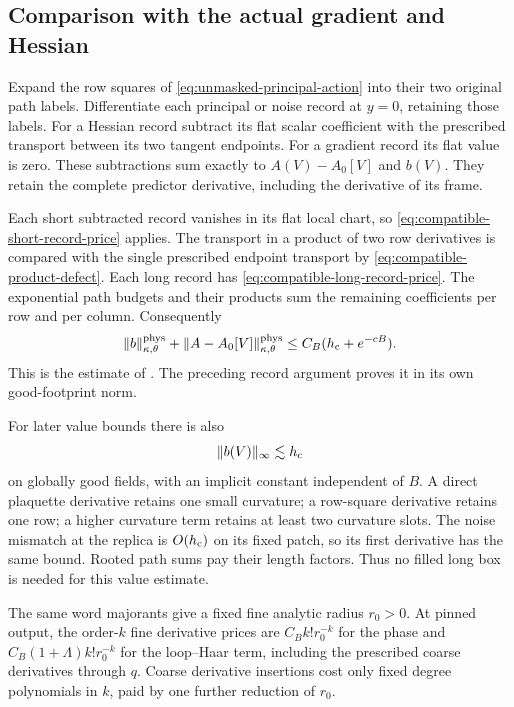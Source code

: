 \documentclass[11pt,reqno]{amsart}
\numberwithin{equation}{section}
\theoremstyle{definition}
\theoremstyle{remark}
\begin{document}
\subsection{Comparison with the actual gradient and Hessian}

Expand the row squares of
\eqref{eq:unmasked-principal-action} into
their two original path labels.
Differentiate each principal or noise
record at \(y=0\), retaining those labels.
For a Hessian record subtract its flat
scalar coefficient with the prescribed
transport between its two tangent endpoints.
For a gradient record its flat value is zero.
These subtractions sum exactly to
\(A(V)-A_0[V]\) and \(b(V)\).
They retain the complete predictor derivative,
including the derivative of its frame.

Each short subtracted record vanishes in
its flat local chart, so
\eqref{eq:compatible-short-record-price}
applies. The transport in a product of
two row derivatives is compared with
the single prescribed endpoint transport
by \eqref{eq:compatible-product-defect}.
Each long record has
\eqref{eq:compatible-long-record-price}.
The exponential path budgets and their
products sum the remaining coefficients
per row and per column. Consequently
\begin{equation}
       \|b\|_{\kappa,\theta}^{\rm phys}
       +\|A-A_0[V]\|_{\kappa,\theta}^{\rm phys}
                         \le C_B(h_{\rm c}+e^{-cB}).
 \label{eq:compatible-actual-comparison}
\end{equation}
This is the estimate of
\cite[Lemma~25.2, pp.~128--132]{Main}.
The preceding record argument proves it
in its own good-footprint norm.

For later value bounds there is also
\begin{equation}
                         \|b(V)\|_\infty\lesssim h_{\rm c}
 \label{eq:compatible-gradient-value}
\end{equation}
on globally good fields, with an implicit constant
independent of \(B\).
A direct plaquette derivative retains
one small curvature; a row-square derivative
retains one row; a higher curvature term
retains at least two curvature slots.
The noise mismatch at the replica is
\(O(h_{\rm c})\) on its fixed patch, so
its first derivative has the same bound.
Rooted path sums pay their length factors.
Thus no filled long box is needed for
this value estimate.

The same word majorants give a fixed fine
analytic radius \(r_0>0\).
At pinned output, the order-\(k\) fine
derivative prices are
\(C_B k!r_0^{-k}\) for the phase and
\(C_B(1+\Lambda)k!r_0^{-k}\) for the
loop--Haar term, including the prescribed
coarse derivatives through \(q\).
Coarse derivative insertions cost only
fixed degree polynomials in \(k\), paid
by one further reduction of \(r_0\).
\end{document}
